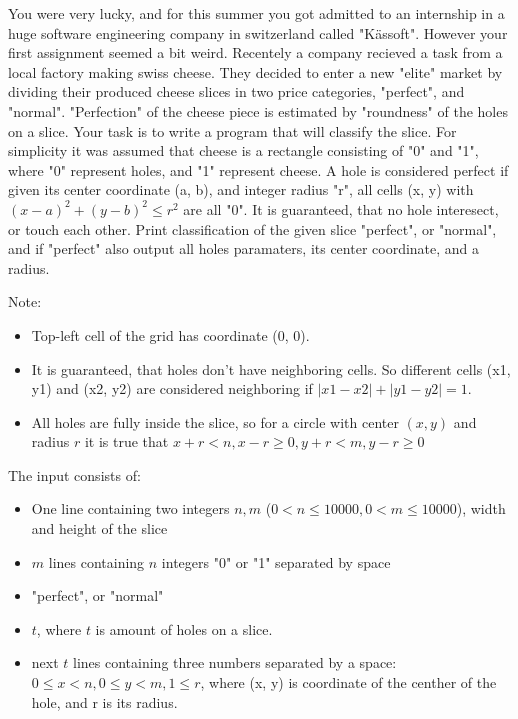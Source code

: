 \problemname{\problemyamlname}


\newcommand{\maxn}{10000}

You were very lucky, and for this summer you got admitted to an internship in a huge software engineering company in switzerland called "Kässoft". 
However your first assignment seemed a bit weird. Recentely a company recieved a task from a local factory making swiss cheese. They decided to enter a new "elite" market by dividing their produced cheese slices in two price categories, "perfect", and "normal".
"Perfection" of the cheese piece is estimated by "roundness" of the holes on a slice. Your task is to write a program that will classify the slice.
For simplicity it was assumed that cheese is a rectangle consisting of "0" and "1", where "0" represent holes, and "1" represent cheese. 
A hole is considered perfect if given its center coordinate (a, b), and integer radius "r", all cells (x, y) with $(x - a)^2 + (y - b)^2 \leq r^2$ are all "0". It is guaranteed, that no hole interesect, or touch each other.
Print classification of the given slice "perfect", or "normal", and if "perfect" also output all holes paramaters, its center coordinate, and a radius.

Note:
\begin{itemize}
    \item Top-left cell of the grid has coordinate (0, 0).
    \item It is guaranteed, that holes don't have neighboring cells. So different cells (x1, y1) and (x2, y2) are considered neighboring if $|x1 - x2| + |y1 - y2| = 1$.
    \item All holes are fully inside the slice, so for a circle with center $(x, y)$ and radius $r$ it is true that $x + r < n, x - r \geq 0, y + r < m, y - r \geq 0$
\end{itemize}

\begin{Input}
    The input consists of:
    \begin{itemize}
        \item One line containing two integers $n, m$ ($0 < n\leq \maxn, 0 < m \leq \maxn$), width and height of the slice
        \item $m$ lines containing $n$ integers "0" or "1" separated by space
    \end{itemize}
\end{Input}

\begin{Output}
    \begin{itemize}
        \item "perfect", or "normal"
        \item $t$, where $t$ is amount of holes on a slice.
        \item next $t$ lines containing three numbers separated by a space: $0 \leq x < n, 0 \leq y < m, 1 \leq r$, where (x, y) is coordinate of the centher of the hole, and r is its radius.
    \end{itemize}
    
\end{Output}



